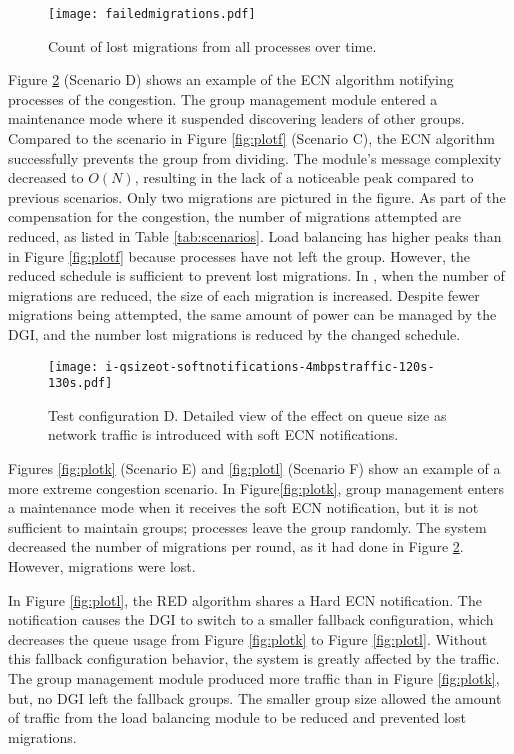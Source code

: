 \begin{figure}
\centering
\texttt{[image: failedmigrations.pdf]}
\caption{Count of lost migrations from all processes over time.}
\label{fig:plotg}
\end{figure}



Figure \ref{fig:ploti} (Scenario D) shows an example of the \ac{ECN} algorithm notifying processes of the congestion.
The group management module entered a maintenance mode where it suspended discovering leaders of other groups.
Compared to the scenario in Figure \ref{fig:plotf} (Scenario C), the \ac{ECN} algorithm successfully prevents the group from dividing.
The module's message complexity decreased to $O(N)$, resulting in the lack of a noticeable peak compared to previous scenarios.
Only two migrations are pictured in the figure.
As part of the compensation for the congestion, the number of migrations attempted are reduced, as listed in Table \ref{tab:scenarios}.
Load balancing has higher peaks than in Figure \ref{fig:plotf} because processes have not left the group.
However, the reduced schedule is sufficient to prevent lost migrations.
In \cite{ecn-cloudhari}, when the number of migrations are reduced, the size of each migration is increased.
Despite fewer migrations being attempted, the same amount of power can be managed by the \ac{DGI}, and the number lost migrations is reduced by the changed schedule.

\begin{figure}
\centering
\texttt{[image: i-qsizeot-softnotifications-4mbpstraffic-120s-130s.pdf]}
\caption{
    Test configuration D.
Detailed view of the effect on queue size as network traffic is introduced with soft \ac{ECN} notifications.
}
\label{fig:ploti}
\end{figure}

Figures \ref{fig:plotk} (Scenario E) and \ref{fig:plotl} (Scenario F) show an example of a more extreme congestion scenario.
In Figure\ref{fig:plotk}, group management enters a maintenance mode when it receives the soft \ac{ECN} notification, but it is not sufficient to maintain groups; processes leave the group randomly.
The system decreased the number of migrations per round, as it had done in Figure \ref{fig:ploti}.
However, migrations were lost.

In Figure \ref{fig:plotl}, the \ac{RED} algorithm shares a Hard \ac{ECN} notification.
The notification causes the \ac{DGI} to switch to a smaller fallback configuration, which decreases the queue usage from Figure \ref{fig:plotk} to Figure \ref{fig:plotl}.
Without this fallback configuration behavior, the system is greatly affected by the traffic.
The group management module produced more traffic than in Figure \ref{fig:plotk}, but, no DGI left the fallback groups.
The smaller group size allowed the amount of traffic from the load balancing module to be reduced and prevented lost migrations.

